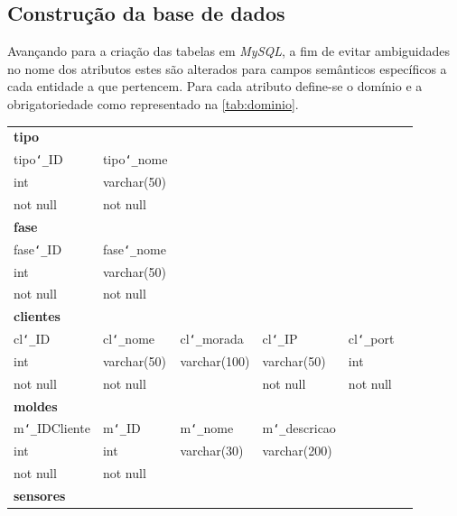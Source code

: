\documentclass[11pt,twoside,a4paper]{report}
\begin{document}
\newpage
\subsection{Construção da base de dados}
Avançando para a criação das tabelas em \textit{MySQL}, a fim de evitar ambiguidades no nome dos atributos estes são alterados para campos semânticos específicos a cada entidade a que pertencem. Para cada atributo define-se o domínio e a obrigatoriedade como representado na \autoref{tab:dominio}.
\begin{table}[H]
	\centering
	\begin{tabular}{|l|l|l|l|l|l|}
		\multicolumn{6}{l}{\textbf{tipo}}\\ \cline{1-2}
		tipo\texttt{\char`_}ID & tipo\texttt{\char`_}nome & \multicolumn{4}{l}{}\\ \cline{1-2}
		int & varchar(50) & \multicolumn{4}{l}{}\\ \cline{1-2}
		not null & not null & \multicolumn{4}{l}{}\\ \cline{1-2}
		\multicolumn{6}{l}{\textbf{fase}}\\ \cline{1-2}
		fase\texttt{\char`_}ID & fase\texttt{\char`_}nome & \multicolumn{4}{l}{}\\ \cline{1-2}
		int & varchar(50) & \multicolumn{4}{l}{}\\ \cline{1-2}
		not null & not null & \multicolumn{4}{l}{}\\ \cline{1-2}
		\multicolumn{6}{l}{\textbf{clientes}}\\ \cline{1-5}
		cl\texttt{\char`_}ID & cl\texttt{\char`_}nome & cl\texttt{\char`_}morada & cl\texttt{\char`_}IP & cl\texttt{\char`_}port & \multicolumn{1}{l}{}\\ \cline{1-5}
		int & varchar(50) & varchar(100) & varchar(50) & int & \multicolumn{1}{l}{}\\ \cline{1-5}
		not null & not null & & not null & not null & \multicolumn{1}{l}{}\\ \cline{1-5}
		\multicolumn{6}{l}{\textbf{moldes}}\\ \cline{1-4}
		m\texttt{\char`_}IDCliente & m\texttt{\char`_}ID & 
		m\texttt{\char`_}nome & 
		m\texttt{\char`_}descricao & \multicolumn{2}{l}{}\\ \cline{1-4}
		int & int & varchar(30) & varchar(200) & \multicolumn{2}{l}{}\\ \cline{1-4}
		not null & not null & & &  \multicolumn{2}{l}{}\\ \cline{1-4}
		\multicolumn{6}{l}{\textbf{sensores}}\\ \cline{1-5}

\end{tabular}
\end{table}
\end{document}
